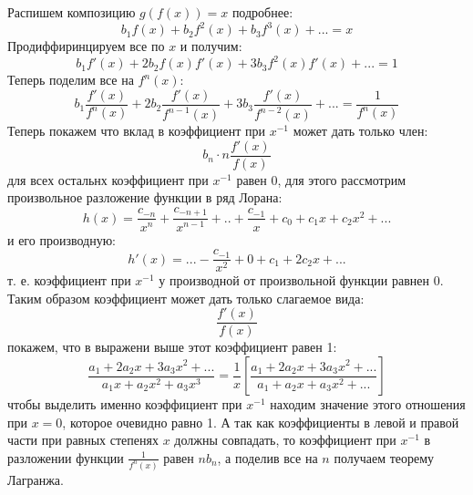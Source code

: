 Распишем композицию $g\left(f\left(x\right)\right) = x$ подробнее:
\[
	b_1 f\left(x\right) + b_2 f^2\left(x\right) + b_3 f^3\left(x\right) + ... = x
\]
Продиффиринцируем все по $x$ и получим:
\[
	b_1 f'\left(x\right) + 2b_2 f\left(x\right)f'\left(x\right) + 3b_3f^2\left(x\right)f'\left(x\right) + ... = 1
\]
Теперь поделим все на $f^n\left(x\right)$:
\[
	b_1\frac{f'\left(x\right)}{f^n\left(x\right)} + 2b_2\frac{f'\left(x\right)}{f^{n-1}\left(x\right)} + 3b_3\frac{f'\left(x\right)}{f^{n-2}\left(x\right)} + ... = \frac{1}{f^n\left(x\right)}
\]
Теперь покажем что вклад в коэффициент при $x^{-1}$ может дать только член:
\[
	b_n \cdot n \frac{f'\left(x\right)}{f\left(x\right)}
\]
для всех остальнх коэффициент при $x^{-1}$ равен 0, для этого рассмотрим произвольное разложение функции в ряд Лорана:
\[
	h\left(x\right) = \frac{c_{-n}}{x^n} + \frac{c_{-n+1}}{x^{n-1}} + .. + \frac{c_{-1}}{x} + c_0 + c_1 x + c_2 x^2 + ...
\]
и его производную:
\[
	h'\left(x\right) = ... - \frac{c_{-1}}{x^2} + 0 + c_1 + 2c_2x + ...
\]
т. е. коэффициент при $x^{-1}$ у производной от произвольной функции равнен 0. Таким образом коэффициент может дать только слагаемое вида:
\[
	\frac{f'\left(x\right)}{f\left(x\right)}
\]
покажем, что в выражени выше этот коэффициент равен 1:
\[
	\frac{a_1 + 2 a_2 x + 3a_3 x^2 + ...}{a_1x + a_2x^2 + a_3x^3} = \frac{1}{x} \left[\frac{a_1 + 2 a_2x + 3a_3 x^2 + ...}{a_1 + a_2x + a_3 x^2 + ...}\right]
\]
чтобы выделить именно коэффициент при $x^{-1}$ находим значение этого отношения при $x = 0$, которое очевидно равно 1. А так как коэффициенты в левой и правой части при равных степенях $x$ должны совпадать, то коэффициент при $x^{-1}$ в разложении функции $\frac{1}{f^n\left(x\right)}$ равен $nb_n$, а поделив все на $n$ получаем теорему Лагранжа.
